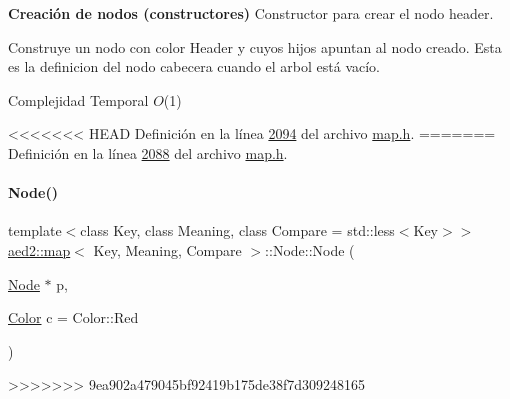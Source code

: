\begin{Indent}{\bf \-Creación de nodos (constructores)}
\-Constructor para crear el nodo header. 

\-Construye un nodo con color \-Header y cuyos hijos apuntan al nodo creado. \-Esta es la definicion del nodo cabecera cuando el arbol está vacío.


\begin{DoxyDescription}
\item[\-Complejidad \-Temporal]$O$(1)
\end{DoxyDescription}

<<<<<<< HEAD
\-Definición en la línea \hyperlink{map_8h_source_l02094}{2094} del archivo \hyperlink{map_8h_source}{map.\-h}.
=======
Definición en la línea \hyperlink{map_8h_source_l02088}{2088} del archivo \hyperlink{map_8h_source}{map.\+h}.

\mbox{\label{structaed2_1_1map_1_1Node_a62b5a42e88e219d53af8237a9ebedb6e_a62b5a42e88e219d53af8237a9ebedb6e}} 
\paragraph{\texorpdfstring{Node()}{Node()}\hspace{0.1cm}{\footnotesize\ttfamily [2/2]}}
{\footnotesize\ttfamily template$<$class Key, class Meaning, class Compare = std\+::less$<$\+Key$>$$>$ \\
\hyperlink{classaed2_1_1map}{aed2\+::map}$<$ Key, Meaning, Compare $>$\+::Node\+::\+Node (\begin{DoxyParamCaption}\item[{\hyperlink{structaed2_1_1map_1_1Node}{Node} $\ast$}]{p,  }\item[{\hyperlink{classaed2_1_1map_a6d62a415a4b9d320b30cada4ebcf9f5b_a6d62a415a4b9d320b30cada4ebcf9f5b}{Color}}]{c = {\ttfamily Color\+:\+:Red} }\end{DoxyParamCaption})\hspace{0.3cm}{\ttfamily [inline]}}
>>>>>>> 9ea902a479045bf92419b175de38f7d309248165

\hypertarget{structaed2_1_1map_1_1Node_a62b5a42e88e219d53af8237a9ebedb6e_a62b5a42e88e219d53af8237a9ebedb6e}{
}
\end{Indent}
